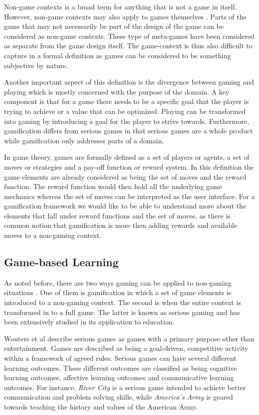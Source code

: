 \documentclass[11pt]{article}
\begin{document}
Non-game contexts is a broad term for anything that is not a game in itself. However, non-game contexts may also apply to games themselves \cite{Deterding2011}. Parts of the game that may not necessarily be part of the design of the game can be considered as non-game contexts. These type of meta-games have been considered as separate from the game design itself. The game-context is thus also difficult to capture in a formal definition as games can be considered to be something subjective by nature. 

Another important aspect of this definition is the divergence between gaming and playing \cite{Groh2012} which is mostly concerned with the purpose of the domain. A key component is that for a game there needs to be a specific goal that the player is trying to achieve or a value that can be optimized. Playing can be transformed into gaming by introducing a goal for the player to strive towards. Furthermore, gamification differs from serious games in that serious games are a whole product while gamification only addresses parts of a domain.

In game theory, games are formally defined as a set of players or agents, a set of moves or strategies and a pay-off function or reward system. In this definition the game elements are already considered as being the set of moves and the reward function. The reward function would then hold all the underlying game mechanics whereas the set of moves can be interpreted as the user interface. For a gamification framework we would like to be able to understand more about the elements that fall under reward functions and the set of moves, as there is common notion that gamification is more then adding rewards and available moves to a non-gaming context.



\subsection{Game-based Learning}
As noted before, there are two ways gaming can be applied to non-gaming situations \cite{Groh2012}. One of them is gamification in which a set of game elements is introduced to a non-gaming context. The second is when the entire context is transformed in to a full game. The latter is known as serious gaming and has been extensively studied \cite{Wouters2009} in its application to education.

Wouters et al describe serious games as games with a primary purpose other than entertainment. Games are described as being a goal-driven, competitive activity within a framework of agreed rules. Serious games can have several different learning outcomes. These different outcomes are classified as being cognitive learning outcomes, affective learning outcomes and communicative learning outcomes. For instance, \emph{River City} is a serious game intended to achieve better communication and problem solving skills, while \emph{America's Army} is geared towards teaching the history and values of the American Army. 
\end{document}
